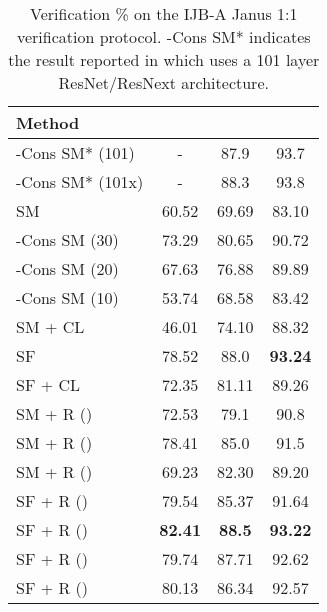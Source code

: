 \documentclass[10pt,twocolumn,letterpaper]{article}
\begin{document}
\begin{table}




\hfill
\centering
\begin{tabular}{l c c c} 

\hline\hline 


Method  &    &   &    \\
\hline 



-Cons SM* (101) \cite{ranjan2017l2} &-     &    87.9  &  93.7  \\ 
-Cons SM* (101x) \cite{ranjan2017l2} & -& 88.3     & 93.8  \\ 




\hline 
\hline














SM    &    60.52   &  69.69     & 83.10   \\ 

-Cons SM (30)  \cite{ranjan2017l2}&  73.29   & 80.65   &   90.72   \\ 
-Cons SM (20)  \cite{ranjan2017l2}&   67.63  &   76.88    & 89.89     \\ 
-Cons SM (10)  \cite{ranjan2017l2}&  53.74   & 68.58    &  83.42    \\ 
SM + CL \cite{wen2016discriminative} &  46.01  & 74.10  &   88.32  \\ 
SF   \cite{liu2017sphereface}& 78.52    &  88.0   &  \textbf{93.24}  \\
SF + CL \cite{wen2016discriminative, liu2017sphereface}  & 72.35   & 81.11  &  89.26 \\
\hline

SM + R () & 72.53  &  79.1  & 90.8     \\ 
SM + R () &   78.41  &  85.0  &  91.5      \\ 
SM + R  ()  &  69.23  &  82.30   &  89.20    \\ 

\hline
SF + R  () & 79.54   &    85.37  &  91.64    \\ 
SF + R  () &   \textbf{82.41}   & \textbf{ 88.5} & \textbf{93.22}     \\ 

SF + R  () & 79.74    &     87.71 &  92.62    \\
SF + R  () &    80.13 &     86.34    & 92.57    \\













\hline
\end{tabular}
\caption{Verification \% on the IJB-A Janus 1:1 verification protocol.  -Cons SM* indicates the result reported in \cite{ranjan2017l2} which uses a 101 layer ResNet/ResNext architecture.}
\label{tab_janus}
\end{table}
\end{document}
